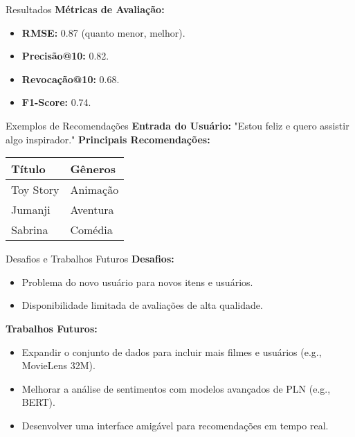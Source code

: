 \documentclass{beamer}
\begin{document}
\begin{frame}{Resultados}
    \textbf{Métricas de Avaliação:}
    \begin{itemize}
        \item \textbf{RMSE:} 0.87 (quanto menor, melhor).
        \item \textbf{Precisão@10:} 0.82.
        \item \textbf{Revocação@10:} 0.68.
        \item \textbf{F1-Score:} 0.74.
    \end{itemize}
\end{frame}

\begin{frame}{Exemplos de Recomendações}
    \textbf{Entrada do Usuário:} "Estou feliz e quero assistir algo inspirador."
    \vspace{0.5cm}
    \textbf{Principais Recomendações:}
    \begin{tabular}{ll}
        \toprule
        \textbf{Título} & \textbf{Gêneros} \\
        \midrule
        Toy Story & Animação \\
        Jumanji & Aventura \\
        Sabrina & Comédia \\
        \bottomrule
    \end{tabular}
\end{frame}

\begin{frame}{Desafios e Trabalhos Futuros}
    \textbf{Desafios:}
    \begin{itemize}
        \item Problema do novo usuário para novos itens e usuários.
        \item Disponibilidade limitada de avaliações de alta qualidade.
    \end{itemize}
    \vspace{0.5cm}
    \textbf{Trabalhos Futuros:}
    \begin{itemize}
        \item Expandir o conjunto de dados para incluir mais filmes e usuários (e.g., MovieLens 32M).
        \item Melhorar a análise de sentimentos com modelos avançados de PLN (e.g., BERT).
        \item Desenvolver uma interface amigável para recomendações em tempo real.
    \end{itemize}
\end{frame}
\end{document}
